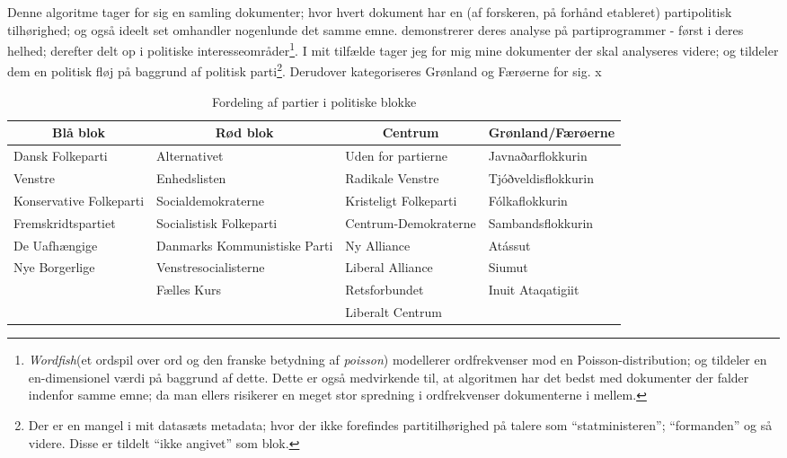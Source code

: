 Denne algoritme tager for sig en samling dokumenter; hvor hvert dokument har en (af forskeren, på forhånd etableret) partipolitisk tilhørighed; og også ideelt set omhandler nogenlunde det samme emne.
\citeauthor{slapinScalingModelEstimating2008} demonstrerer deres analyse på partiprogrammer - først i deres helhed; derefter delt op i politiske interesseområder\footnote{\textit{Wordfish}(et ordspil over ord og den franske betydning af \textit{poisson}) modellerer ordfrekvenser mod en Poisson-distribution; og tildeler en en-dimensionel værdi på baggrund af dette. Dette er også medvirkende til, at algoritmen har det bedst med dokumenter der falder indenfor samme emne; da man ellers risikerer en meget stor spredning i ordfrekvenser dokumenterne i mellem.}.
I mit tilfælde tager jeg for mig mine dokumenter der skal analyseres videre; og tildeler dem en politisk fløj på baggrund af politisk parti\footnote{Der er en mangel i mit datasæts metadata; hvor der ikke forefindes partitilhørighed på talere som “statministeren”; “formanden” og så videre. Disse er tildelt “ikke angivet” som blok.}.
Derudover kategoriseres Grønland og Færøerne for sig.
x
\begin{table}
\caption{Fordeling af partier i politiske blokke}
\label{tab:party2bloc}
\begin{adjustwidth}{-0.8in}{-0.8in}
\begin{tabular}{@{}llll@{}}
\multicolumn{1}{c}{\textbf{Blå blok}} & \multicolumn{1}{c}{\textbf{Rød blok}} & \multicolumn{1}{c}{\textbf{Centrum}} & \multicolumn{1}{c}{\textbf{Grønland/Færøerne}} \\ \midrule
Dansk Folkeparti        & Alternativet                  & Uden for partierne    & Javnaðarflokkurin                           \\
Venstre                 & Enhedslisten                  & Radikale Venstre      & Tjóðveldisflokkurin                         \\
Konservative Folkeparti & Socialdemokraterne            & Kristeligt Folkeparti & Fólkaflokkurin                              \\
Fremskridtspartiet      & Socialistisk Folkeparti       & Centrum-Demokraterne  & Sambandsflokkurin                           \\
De Uafhængige           & Danmarks Kommunistiske Parti  & Ny Alliance           & Atássut                                     \\
Nye Borgerlige          & Venstresocialisterne          & Liberal Alliance      & Siumut                                      \\
                        & Fælles Kurs                   & Retsforbundet         & Inuit Ataqatigiit                            \\
                        & & Liberalt Centrum            &                                                \\ \bottomrule
\end{tabular}
\end{adjustwidth}
\end{table}


